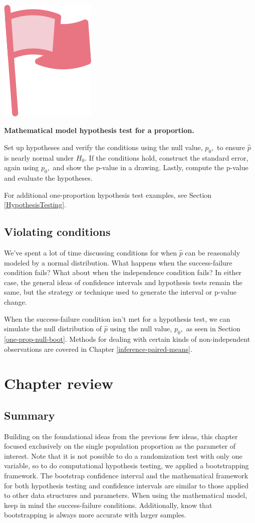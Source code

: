 \documentclass[
  10pt,
  openany]{book}
\newenvironment{mdframedwithfootImportant}
{   
    \savenotes
    \begin{mdframed}[%
    topline=true, bottomline=true, linecolor=oiR, linewidth=0.5pt,
    rightline=false, leftline=false,
    backgroundcolor=oiLGray]
    \renewcommand{\thempfootnote}{\arabic{footnote}}
    }
{
    \end{mdframed}
    \spewnotes
}
\newenvironment{important}{
    \let\oldtextbf\textbf
    \renewcommand{\textbf}[1]{{\textcolor{oiR}{\oldtextbf{##1}}}}
\vspace{4mm}
\begin{mdframedwithfootImportant}
\begin{minipage}[t]{0.10\textwidth}
{$\:$ \\ \setkeys{Gin}{width=2.5em,keepaspectratio}\includegraphics{images/_icons/important.png}}
\end{minipage}
\hfill
\begin{minipage}[t]{0.90\textwidth}
\vspace{-2mm}
\setlength{\parskip}{1em}
}{\end{minipage}
\end{mdframedwithfootImportant}
\vspace{4mm}
}
\begin{document}
\begin{important}
\textbf{Mathematical model hypothesis test for a proportion.}

Set up hypotheses and verify the conditions using the null value, \(p_0,\) to ensure \(\hat{p}\) is nearly normal under \(H_0.\) If the conditions hold, construct the standard error, again using \(p_0,\) and show the p-value in a drawing.
Lastly, compute the p-value and evaluate the hypotheses.

\end{important}

For additional one-proportion hypothesis test examples, see Section \ref{HypothesisTesting}.

\hypertarget{violating-conditions}{%
\subsection{Violating conditions}\label{violating-conditions}}

We've spent a lot of time discussing conditions for when \(\hat{p}\) can be reasonably modeled by a normal distribution.
What happens when the success-failure condition fails?
What about when the independence condition fails?
In either case, the general ideas of confidence intervals and hypothesis tests remain the same, but the strategy or technique used to generate the interval or p-value change.

When the success-failure condition isn't met for a hypothesis test, we can simulate the null distribution of \(\hat{p}\) using the null value, \(p_0,\) as seen in Section \ref{one-prop-null-boot}.
Methods for dealing with certain kinds of non-independent observations are covered in Chapter \ref{inference-paired-means}.

\vspace{10mm}

\hypertarget{chp16-review}{%
\section{Chapter review}\label{chp16-review}}

\hypertarget{summary-9}{%
\subsection{Summary}\label{summary-9}}

Building on the foundational ideas from the previous few ideas, this chapter focused exclusively on the single population proportion as the parameter of interest.
Note that it is not possible to do a randomization test with only one variable, so to do computational hypothesis testing, we applied a bootstrapping framework.
The bootstrap confidence interval and the mathematical framework for both hypothesis testing and confidence intervals are similar to those applied to other data structures and parameters.
When using the mathematical model, keep in mind the success-failure conditions.
Additionally, know that bootstrapping is always more accurate with larger samples.
\end{document}
